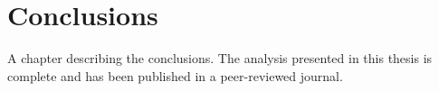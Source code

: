 \chapter{Conclusions}
\label{chap:conclusions}

A chapter describing the conclusions. The analysis presented in this thesis is complete and has been published in a peer-reviewed journal\cite{CMS-SUS-17-006}.
